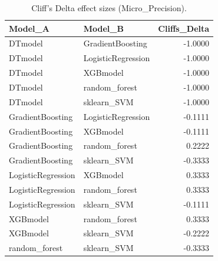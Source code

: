 \begin{table}[t]
\centering
\begin{tabular}{llr}
\toprule
Model_A & Model_B & Cliffs_Delta \\
\midrule
DTmodel & GradientBoosting & -1.0000 \\
DTmodel & LogisticRegression & -1.0000 \\
DTmodel & XGBmodel & -1.0000 \\
DTmodel & random_forest & -1.0000 \\
DTmodel & sklearn_SVM & -1.0000 \\
GradientBoosting & LogisticRegression & -0.1111 \\
GradientBoosting & XGBmodel & -0.1111 \\
GradientBoosting & random_forest & 0.2222 \\
GradientBoosting & sklearn_SVM & -0.3333 \\
LogisticRegression & XGBmodel & 0.3333 \\
LogisticRegression & random_forest & 0.3333 \\
LogisticRegression & sklearn_SVM & -0.1111 \\
XGBmodel & random_forest & 0.3333 \\
XGBmodel & sklearn_SVM & -0.2222 \\
random_forest & sklearn_SVM & -0.3333 \\
\bottomrule
\end{tabular}
\caption{Cliff's Delta effect sizes (Micro_Precision).}
\label{tab:cliffs_Micro_Precision}
\end{table}